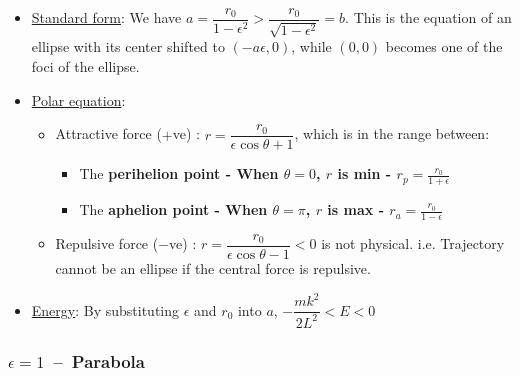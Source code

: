 \documentclass[class=article, crop=false, 12pt]{standalone}
\begin{document}
\begin{itemize}

    \item \ul{Standard form}: We have $a= \dfrac{r_0}{1-\epsilon^2} > \dfrac{r_0}{\sqrt{1-\epsilon^2}} = b$.
    This is the equation of an ellipse with its center shifted to $(-a\epsilon,0)$,
    while $(0,0)$ becomes one of the foci of the ellipse.

    \item \ul{Polar equation}:
    
    \begin{itemize}
        \item Attractive force ($+$ve) : $r=\dfrac{r_0}{\epsilon\cos\theta + 1}$,
        which is in the range between:
        \begin{itemize}
            \item The \bf{perihelion} point - When $\theta=0$, $r$ is min - $\boxed{r_p = \frac{r_0}{1+\epsilon}}$
            
            \item The \bf{aphelion} point - When $\theta=\pi$, $r$ is max - $\boxed{r_a = \frac{r_0}{1-\epsilon}}$
        \end{itemize}
    
        \item Repulsive force ($-$ve) : $r=\dfrac{r_0}{\epsilon\cos\theta - 1} <0$ is not physical. 
        i.e. Trajectory cannot be an ellipse if the central force is repulsive.

    \end{itemize}
    
    \item \ul{Energy}: By substituting $\epsilon$ and $r_0$ into $a$, $\boxed{ -\dfrac{mk^2}{2L^2} < E < 0}$
\end{itemize}



\subsubsection{$\epsilon=1$ \,--\, Parabola}
\end{document}

